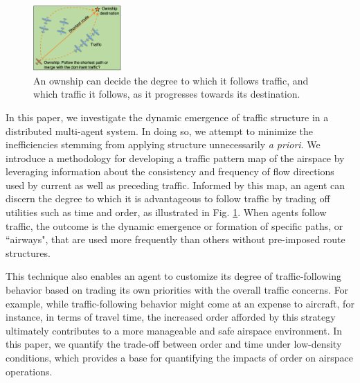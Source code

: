 \documentclass[conference, letter]{IEEEtran}
\begin{document}

\begin{figure}[hbt!]
\centering
\includegraphics[width=0.3\textwidth]{intro.png}
\caption{An ownship can decide the degree to which it follows traffic, and which traffic it follows, as it progresses towards its destination.}
\label{following}
\end{figure}


In this paper, we investigate the dynamic emergence of traffic structure in a distributed multi-agent system. In doing so, we attempt to minimize the inefficiencies stemming from applying structure unnecessarily \textit{a priori}. We introduce a methodology for developing a traffic pattern map of the airspace by leveraging information about the consistency and frequency of flow directions used by current as well as preceding traffic. Informed by this map, an agent can discern the degree to which it is advantageous to follow traffic by trading off utilities such as time and order, as illustrated in Fig. \ref{following}. When agents follow traffic, the outcome is the dynamic emergence or formation of specific paths, or ``airways", that are used more frequently than others without pre-imposed route structures. 


This technique also enables an agent to customize its degree of traffic-following behavior based on trading its own priorities with the overall traffic concerns. For example, while traffic-following behavior might come at an expense to aircraft, for instance, in terms of travel time, the increased order afforded by this strategy ultimately contributes to a more manageable and safe airspace environment. In this paper, we quantify the trade-off between order and time under low-density conditions, which provides a base for quantifying the impacts of order on airspace operations.  




\end{document}
